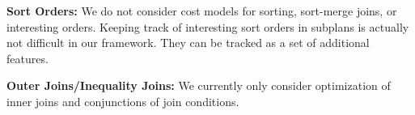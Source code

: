  \vspace{0.5em} \noindent \textbf{Sort Orders: } We do not consider cost models for sorting, sort-merge joins, or interesting orders. Keeping track of interesting sort orders in subplans is actually not difficult in our framework. They can be tracked as a set of additional features. 

\vspace{0.5em} \noindent  \textbf{Outer Joins/Inequality Joins: } We currently only consider optimization of inner joins and conjunctions of join conditions.

